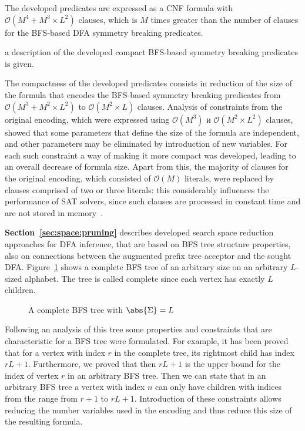 The developed predicates are expressed as a CNF formula with $\mathcal{O}\left(M^{4} + M^{3} \times L^{2}\right)$ clauses, 
which is $M$ times greater than the number of clauses for the BFS-based DFA symmetry breaking predicates.

\insectionen{\ref{sec:space:tight}} a description of the developed compact BFS-based symmetry breaking predicates is given.

The compactness of the developed predicates consists in reduction of the size of the formula that encodes the BFS-based symmetry breaking predicates from
$\mathcal{O}\left(M^{3} + M^{2} \times L^{2}\right)$ to $\mathcal{O}\left(M^{2} \times L\right)$ clauses.
Analysis of constraints from the original encoding, which were expressed using $\mathcal{O}\left(M^{3}\right)$ и $\mathcal{O}\left(M^{2} \times L^{2}\right)$ clauses,
showed that some parameters that define the size of the formula are independent, and other parameters may be eliminated by introduction of new variables.
For each such constraint a way of making it more compact was developed, leading to an overall decrease of formula size.
Apart from this, the majority of clauses for the original encoding, which consisted of  $\mathcal{O}\left(M\right)$ literals,
were replaced by clauses comprised of two or three literals: this considerably influences the performance of SAT solvers, since such clauses are processed in constant time
and are not stored in memory~\cite{MSilva-SATbook09}.

\textbf{Section~\ref{sec:space:pruning}} describes developed search space reduction approaches for DFA inference, that are based on BFS tree structure properties, 
also on connections between the augmented prefix tree acceptor and the sought DFA.
Figure~\ref{syn-en:img:full-bfs} shows a complete BFS tree of an arbitrary size on an arbitrary $L$-sized alphabet.
The tree is called complete since each vertex has exactly $L$ children.

\begin{figure}[ht]
  \centering
  \scalebox{0.625}{}
  \caption{A complete BFS tree with $\abs{\Sigma}=L$}
  \label{syn-en:img:full-bfs}
\end{figure}

Following an analysis of this tree some properties and constraints that are characteristic for a BFS tree were formulated.
For example, it has been proved that for a vertex with index $r$ in the complete tree, its rightmost child has index $rL + 1$.
Furthermore, we proved that then $rL + 1$ is the upper bound for the index of vertex $r$ in an arbitrary BFS tree.
Then we can state that in an arbitrary BFS tree a vertex with index $n$ can only have children with indices from the range from $r + 1$ to $rL + 1$.
Introduction of these constraints allows reducing the number variables used in the encoding and thus reduce this size of the resulting formula.


